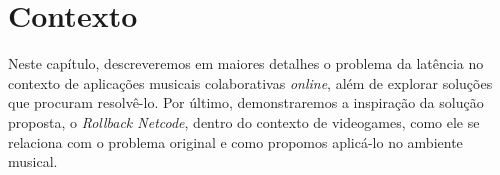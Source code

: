 \chapter{Contexto}

Neste capítulo, descreveremos em maiores detalhes o problema da latência no contexto de aplicações musicais colaborativas \textit{online}, além de explorar soluções que procuram resolvê-lo. Por último, demonstraremos a inspiração da solução proposta, o \textit{Rollback Netcode}, dentro do contexto de videogames, como ele se relaciona com o problema original e como propomos aplicá-lo no ambiente musical.
